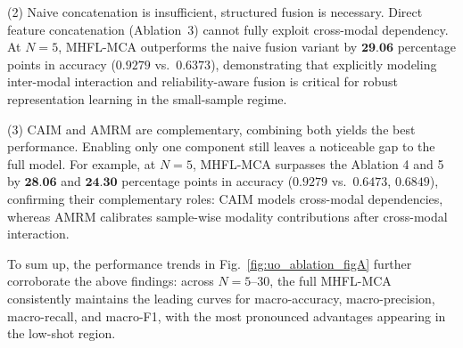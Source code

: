 \documentclass[a4paper]{cas-sc}
\begin{document}
(2) Naive concatenation is insufficient, structured fusion is necessary. Direct feature concatenation (Ablation~3) cannot fully exploit cross-modal dependency. At $N=5$, MHFL-MCA outperforms the naive fusion variant by $\textbf{29.06}$ percentage points in accuracy ($0.9279$ vs.\ $0.6373$), demonstrating that explicitly modeling inter-modal interaction and reliability-aware fusion is critical for robust representation learning in the small-sample regime.

(3) CAIM and AMRM are complementary, combining both yields the best performance. Enabling only one component still leaves a noticeable gap to the full model. For example, at $N=5$, MHFL-MCA surpasses the Ablation 4 and 5 by $\textbf{28.06}$ and $\textbf{24.30}$ percentage points in accuracy ($0.9279$ vs.\ $0.6473$, $0.6849$), confirming their complementary roles: CAIM models cross-modal dependencies, whereas AMRM calibrates sample-wise modality contributions after cross-modal interaction.

To sum up, the performance trends in Fig.~\ref{fig:uo_ablation_figA} further corroborate the above findings:
across $N=5$--$30$, the full MHFL-MCA consistently maintains the leading curves for macro-accuracy, macro-precision,
macro-recall, and macro-F1, with the most pronounced advantages appearing in the low-shot region.
\end{document}
